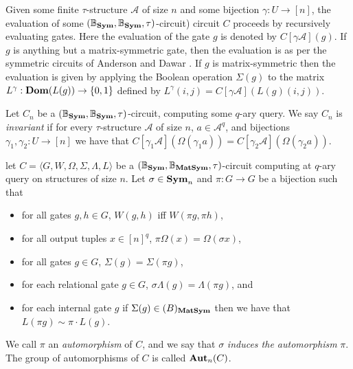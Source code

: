 \documentclass[../paper.tex]{subfiles}
\begin{document}
Given some finite $\tau$-structure $\mathcal{A}$ of size $n$ and some bijection
$\gamma: U \rightarrow [n]$, the evaluation of some $(\mathbb{B}_{\text{\textbf{Sym}}},
\mathbb{B}_{\text{\textbf{Sym}}}, \tau)$-circuit) circuit $C$ proceeds by recursively evaluating
gates. Here the evaluation of the gate $g$ is denoted by $C[\gamma
\mathcal{A}](g)$. If $g$ is anything but a matrix-symmetric gate, then the
evaluation is as per the symmetric circuits of Anderson and Dawar \cite{}. If
$g$ is matrix-symmetric then the evaluation is given by applying the Boolean
operation $\Sigma(g)$ to the matrix $L^{\gamma}:\text{\textbf{Dom}}(L(g)) \rightarrow \{0,1\}$
defined by $L^{\gamma}(i,j) = C[\gamma \mathcal{A}](L(g)(i,j))$.


\begin{definition}
  Let $C_n$ be a $(\mathbb{B}_{\text{\textbf{Sym}}}, \mathbb{B}_{\text{\textbf{Sym}}}, \tau)$-circuit, computing
  some $q$-ary query. We say $C_n$ is \emph{invariant} if for every
  $\tau$-structure $\mathcal{A}$ of size $n$, $a \in \mathcal{A}^q$, and
  bijections $\gamma_1, \gamma_2: U \rightarrow [n]$ we have that $C[\gamma_1
  \mathcal{A}](\Omega (\gamma_1 a)) = C[\gamma_2 \mathcal{A}](\Omega (\gamma_2
  a))$.
\end{definition}


\begin{definition}[Automorphism]
  let $C = \langle G, W, \Omega, \Sigma, \Lambda, L\rangle$ be a
  $(\mathbb{B}_{\text{\textbf{Sym}}}, \mathbb{B}_{\text{\textbf{MatSym}}}, \tau)$-circuit computing at $q$-ary
  query on structures of size $n$. Let $\sigma \in \text{\textbf{Sym}}_n$ and $\pi: G
  \rightarrow G$ be a bijection such that
  \begin{itemize}
    \setlength\itemsep{0mm}
  \item for all gates $g, h \in G$, $W(g,h)$ iff $W(\pi g, \pi h)$,
  \item for all output tuples $x \in [n]^q$, $\pi \Omega (x) = \Omega (\sigma
    x)$,
  \item for all gates $g \in G$, $\Sigma (g) = \Sigma (\pi g)$,
  \item for each relational gate $g \in G$, $\sigma \Lambda (g) = \Lambda (\pi
    g)$, and
  \item for each internal gate $g$ if $\Sigma (g) \in \mathbb(B)_{\text{\textbf{MatSym}}}$ then
    we have that $L(\pi g) \sim \pi \cdot L(g)$.
  \end{itemize}

  We call $\pi$ an \emph{automorphism} of $C$, and we say that $\sigma$
  \emph{induces the automorphism} $\pi$. The group of automorphisms of $C$ is
  called $\text{\textbf{Aut}}_n (C)$.
\end{definition}
\end{document}
